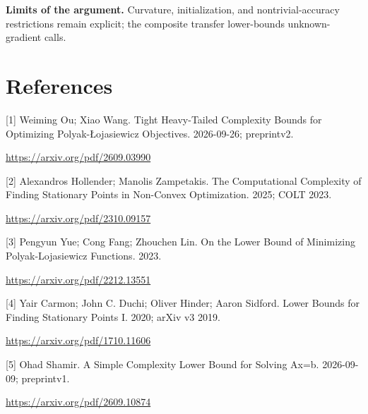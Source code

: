 \documentclass[10pt,a4paper]{article}
\begin{document}
\textbf{Limits of the argument.} Curvature, initialization, and nontrivial-accuracy restrictions remain explicit; the composite transfer lower-bounds unknown-gradient calls.

\section{References}
[1] Weiming Ou; Xiao Wang. Tight Heavy-Tailed Complexity Bounds for Optimizing Polyak-Łojasiewicz Objectives. 2026-09-26; preprintv2.

\url{https://arxiv.org/pdf/2609.03990}

[2] Alexandros Hollender; Manolis Zampetakis. The Computational Complexity of Finding Stationary Points in Non-Convex Optimization. 2025; COLT 2023.

\url{https://arxiv.org/pdf/2310.09157}

[3] Pengyun Yue; Cong Fang; Zhouchen Lin. On the Lower Bound of Minimizing Polyak-Lojasiewicz Functions. 2023.

\url{https://arxiv.org/pdf/2212.13551}

[4] Yair Carmon; John C. Duchi; Oliver Hinder; Aaron Sidford. Lower Bounds for Finding Stationary Points I. 2020; arXiv v3 2019.

\url{https://arxiv.org/pdf/1710.11606}

[5] Ohad Shamir. A Simple Complexity Lower Bound for Solving Ax=b. 2026-09-09; preprintv1.

\url{https://arxiv.org/pdf/2609.10874}
\end{document}
